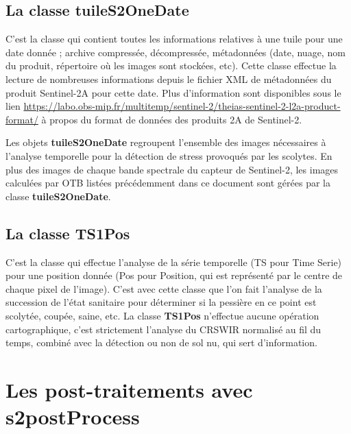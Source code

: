 \documentclass[a4paper, 12pt]{article} %
\begin{document}
\subsection{La classe \textbf{tuileS2OneDate}}
C'est la classe qui contient toutes les informations relatives à une tuile pour une date donnée ; archive compressée, décompressée, métadonnées (date, nuage, nom du produit, répertoire où les images sont stockées, etc). Cette classe effectue la lecture de nombreuses informations depuis le fichier XML de métadonnées du produit Sentinel-2A pour cette date. Plus d'information sont disponibles sous le lien \url{https://labo.obs-mip.fr/multitemp/sentinel-2/theias-sentinel-2-l2a-product-format/} à propos du format de données des produits 2A de Sentinel-2.

Les objets \textbf{tuileS2OneDate} regroupent l'ensemble des images nécessaires à l'analyse temporelle pour la détection de stress provoqués par les scolytes. En plus des images de chaque bande spectrale du capteur de Sentinel-2, les images calculées par OTB listées précédemment dans ce document sont gérées par la classe \textbf{tuileS2OneDate}.

\subsection{La classe \textbf{TS1Pos}}
C'est la classe qui effectue l'analyse de la série temporelle (TS pour Time Serie) pour une position donnée (Pos pour Position, qui est représenté par le centre de chaque pixel de l'image). C'est avec cette classe que l'on fait l'analyse de la succession de l'état sanitaire pour déterminer si la pessière en ce point est scolytée, coupée, saine, etc. La classe \textbf{TS1Pos} n'effectue aucune opération cartographique, c'est strictement l'analyse du CRSWIR normalisé au fil du temps, combiné avec la détection ou non de sol nu, qui sert d'information.


\section{Les post-traitements avec s2{\textunderscore}postProcess}
\end{document}
